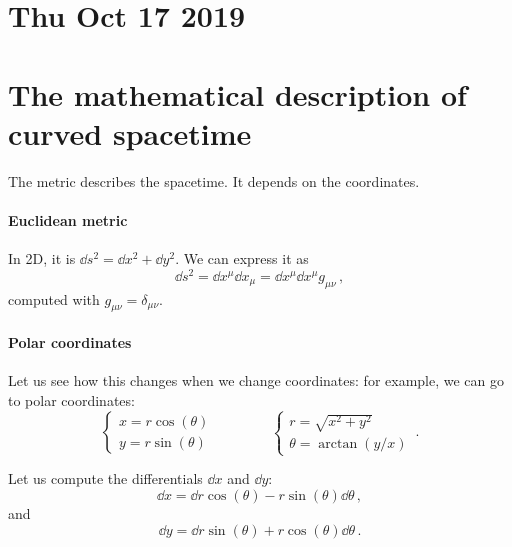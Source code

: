 \documentclass[main.tex]{subfiles}
\begin{document}
\section*{Thu Oct 17 2019}

\section{The mathematical description of curved spacetime}

The metric describes the spacetime. It depends on the coordinates.

\paragraph{Euclidean metric}

In 2D, it is \(\dd{s^2}  = \dd{x^2} + \dd{y^2} \). We can express it as 
%
\begin{equation}
  \dd{s^2} = \dd{x^{\mu }} \dd{x_{\mu }} = \dd{x^{\mu}} \dd{x^{\mu }} g_{\mu \nu } 
\,,
\end{equation}
%
computed with \(g_{\mu \nu } = \delta_{\mu \nu }\).

\paragraph{Polar coordinates}

Let us see how this changes when we change coordinates: for example, we can go to polar coordinates: 
%
\begin{equation}
    \begin{cases}
        x = r \cos(\theta ) \\
        y = r \sin(\theta ) 
    \end{cases}
    \qquad \qquad
    \begin{cases}
        r = \sqrt{x^2+y^2} \\
        \theta = \arctan(y/x)
    \end{cases}
\,.
\end{equation}
%

Let us compute the differentials \(\dd{x} \)   and \(\dd{y}\): 
%
\begin{equation}
  \dd{x} = \dd{r} \cos(\theta ) - r \sin(\theta ) \dd{\theta } 
\,,
\end{equation}
%
and 
%
\begin{equation}
  \dd{y} = \dd{r} \sin(\theta ) + r \cos(\theta ) \dd{\theta } 
\,.
\end{equation}
%
\end{document}
